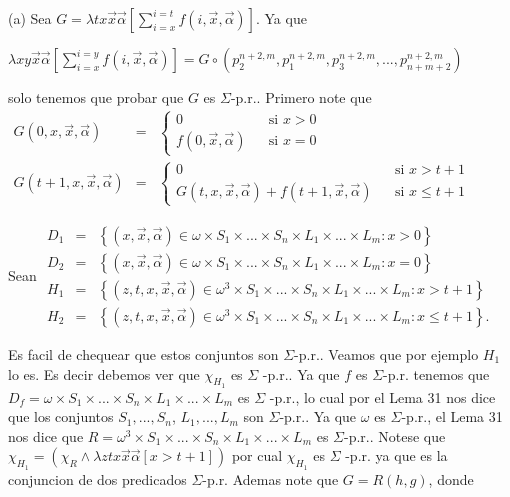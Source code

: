 \PROOF (a) Sea \(G=\lambda tx\vec{x}\vec{\alpha}\left[ \sum_{i=x}^{i=t}f(i,\vec{x}, \vec{\alpha})\right] \). Ya que

\(\displaystyle \lambda xy\vec{x}\vec{\alpha}\left[ \sum_{i=x}^{i=y}f(i,\vec{x},\vec{\alpha}) \right] =G\circ \left( p_{2}^{n+2,m},p_{1}^{n+2,m},p_{3}^{n+2,m},...,p_{n+m+2}^{n+2,m}\right) \)

solo tenemos que probar que \(G\) es \(\Sigma \)-p.r.. Primero note que
\(\displaystyle \begin{array}{rcl} G(0,x,\vec{x},\vec{\alpha}) & =& \left\{ \begin{array}{lll} 0 & & \text{si }x >0 \\ f(0,\vec{x},\vec{\alpha}) & & \text{si }x=0 \end{array} \right. \\ G(t+1,x,\vec{x},\vec{\alpha}) & =& \left\{ \begin{array}{lll} 0 & & \text{si }x >t+1 \\ G(t,x,\vec{x},\vec{\alpha})+f(t+1,\vec{x},\vec{\alpha}) & & \text{si }x\leq t+1 \end{array} \right. \end{array} \)

Sean
\(\displaystyle \begin{array}{rcl} D_{1} & =& \left\{ (x,\vec{x},\vec{\alpha})\in \omega \times S_{1}\times ...\times S_{n}\times L_{1}\times ...\times L_{m}:x >0\right\} \\ D_{2} & =& \left\{ (x,\vec{x},\vec{\alpha})\in \omega \times S_{1}\times ...\times S_{n}\times L_{1}\times ...\times L_{m}:x=0\right\} \\ H_{1} & =& \left\{ (z,t,x,\vec{x},\vec{\alpha})\in \omega ^{3}\times S_{1}\times ...\times S_{n}\times L_{1}\times ...\times L_{m}:x >t+1\right\} \\ H_{2} & =& \left\{ (z,t,x,\vec{x},\vec{\alpha})\in \omega ^{3}\times S_{1}\times ...\times S_{n}\times L_{1}\times ...\times L_{m}:x\leq t+1\right\} . \end{array} \)

Es facil de chequear que estos conjuntos son \(\Sigma \)-p.r.. Veamos que por ejemplo \(H_{1}\) lo es. Es decir debemos ver que \(\chi _{H_{1}}\) es \(\Sigma \) -p.r.. Ya que \(f\) es \(\Sigma \)-p.r. tenemos que \(D_{f}=\omega \times S_{1}\times ...\times S_{n}\times L_{1}\times ...\times L_{m}\) es \(\Sigma \) -p.r., lo cual por el Lema 31 nos dice que los conjuntos \( S_{1},...,S_{n}\), \(L_{1},...,L_{m}\) son \(\Sigma \)-p.r.. Ya que \(\omega \) es \( \Sigma \)-p.r., el Lema 31 nos dice que \(R=\omega ^{3}\times S_{1}\times ...\times S_{n}\times L_{1}\times ...\times L_{m}\) es \(\Sigma \)-p.r.. Notese que \(\chi _{H_{1}}=(\chi _{R}\wedge \lambda ztx\vec{x} \vec{\alpha}\left[ x >t+1\right] )\) por cual \(\chi _{H_{1}}\) es \(\Sigma \) -p.r. ya que es la conjuncion de dos predicados \(\Sigma \)-p.r.
Ademas note que \(G=R(h,g)\), donde

